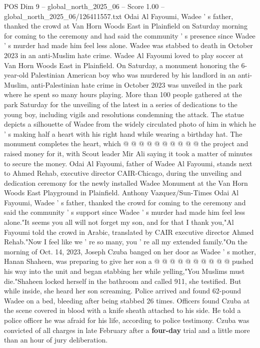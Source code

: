 \begin{textsample}{POS Dim 9 – global\_north\_2025\_06 – Score 1.00 – global\_north\_2025\_06/126411557.txt}  \label{ex:f9_pos_373}
Odai Al Fayoumi, Wadee ' s father, thanked the crowd at Van Horn Woods East in Plainfield on Saturday morning for coming to the ceremony and had said the community ' s presence since Wadee ' s murder had made him feel less alone.
Wadee was stabbed to death in October 2023 in an anti-Muslim hate crime.
Wadee Al Fayoumi loved to play soccer at Van Horn Woods East in Plainfield.
On Saturday, a monument honoring the 6-year-old Palestinian American boy who was murdered by his landlord in an anti-Muslim, anti-Palestinian hate crime in October 2023 was unveiled in the park where he spent so many hours playing.
More than 100 people gathered at the park Saturday for the unveiling of the latest in a series of dedications to the young boy, including vigils and resolutions condemning the attack.
The statue depicts a silhouette of Wadee from the widely circulated photo of him in which he ' s making half a heart with his right hand while wearing a birthday hat.
The monument completes the heart, which @ @ @ @ @ @ @ @ @ @ the project and raised money for it, with Scout leader Mir Ali saying it took a matter of minutes to secure the money.
Odai Al Fayoumi, father of Wadee Al Fayoumi, stands next to Ahmed Rehab, executive director CAIR-Chicago, during the unveiling and dedication ceremony for the newly installed Wadee Monument at the Van Horn Woods East Playground in Plainfield.
Anthony Vazquez/Sun-Times Odai Al Fayoumi, Wadee ' s father, thanked the crowd for coming to the ceremony and said the community ' s support since Wadee ' s murder had made him feel less alone."It seems you all will not forget my son, and for that I thank you,"Al Fayoumi told the crowd in Arabic, translated by CAIR executive director Ahmed Rehab."Now I feel like we ' re so many, you ' re all my extended family."On the morning of Oct. 14, 2023, Joseph Czuba banged on her door as Wadee ' s mother, Hanan Shaheen, was preparing to give her son a @ @ @ @ @ @ @ @ @ @ pushed his way into the unit and began stabbing her while yelling,"You Muslims must die."Shaheen locked herself in the bathroom and called 911, she testified.
But while inside, she heard her son screaming.
Police arrived and found 62-pound Wadee on a bed, bleeding after being stabbed 26 times.
Officers found Czuba at the scene covered in blood with a knife sheath attached to his side.
He told a police officer he was afraid for his life, according to police testimony.
Czuba was convicted of all charges in late February after a \textbf{four-day} trial and a little more than an hour of jury deliberation.

\end{textsample}
